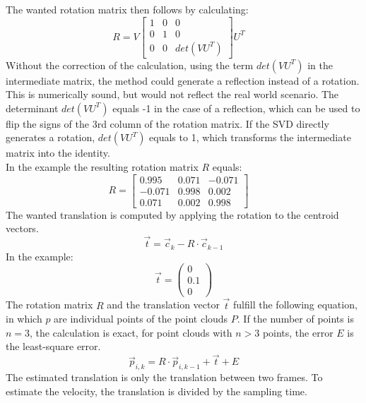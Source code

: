 The wanted rotation matrix then follows by calculating:
\begin{equation*}
    R=V
    \begin{bmatrix}
        1 & 0 & 0 \\
        0 & 1 & 0 \\
        0 & 0 & det(VU^{T})
    \end{bmatrix}U^{T} \quad
\end{equation*}
Without the correction of the calculation, using the term $det(VU^{T})$ in the intermediate matrix, the method could generate a reflection instead of a rotation. This is numerically sound, but would not reflect the real world scenario. The determinant $det(VU^{T})$ equals -1 in the case of a reflection, which can be used to flip the signs of the 3rd column of the rotation matrix. If the SVD directly generates a rotation, $det(VU^{T})$ equals to 1, which transforms the intermediate matrix into the identity.\\
In the example the resulting rotation matrix $R$ equals:
\begin{equation*}
    R=
    \begin{bmatrix}
        0.995 & 0.071  & -0.071 \\
        -0.071 & 0.998  & 0.002 \\
        0.071& 0.002 & 0.998
    \end{bmatrix} \quad
\end{equation*}
The wanted translation is computed by applying the rotation to the centroid vectors. 
\begin{equation*}
    \vec{t} = \vec{c}_{k}-R\cdot\vec{c}_{k-1}
\end{equation*}
In the example:
\begin{equation*}
    \vec{t} = 
    \begin{pmatrix}
        0 \\
        0.1 \\
        0
    \end{pmatrix}
\end{equation*}
The rotation matrix $R$ and the translation vector $\vec{t}$ fulfill the following equation, in which $p$ are individual points of the point clouds $P$. If the number of points is $n=3$, the calculation is exact, for point clouds with $n>3$ points, the error $E$ is the least-square error\cite{SVD_ETH}.
\begin{equation*}
    \vec{p}_{i,k} = R\cdot\vec{p}_{i,k-1}+\vec{t}+E
\end{equation*}
The estimated translation is only the translation between two frames. To estimate the velocity, the translation is divided by the sampling time.

